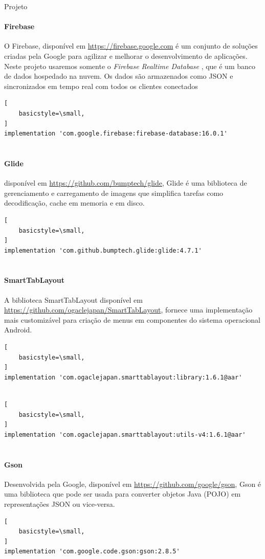 \documentclass[
	12pt,				%
	openright,			%
	twoside,			%
	a4paper,			%
	english,			%
	french,				%
	spanish,			%
	brazil				%
	]{abntex2}
\begin{document}
\begin{chapter}{Projeto}
   \paragraph{Firebase}
O Firebase, disponível em \url{https://firebase.google.com} é um conjunto de soluções criadas pela Google para agilizar e melhorar o desenvolvimento de aplicações. Neste projeto usaremos somente o \textit{Firebase Realtime Database} , que é um banco de dados hospedado na nuvem. Os dados são armazenados como JSON e sincronizados em tempo real com todos os clientes conectados
        \begin{lstlisting}[
    basicstyle=\small,
]
implementation 'com.google.firebase:firebase-database:16.0.1'
  
\end{lstlisting}
   \paragraph{Glide}
   disponível em \url{https://github.com/bumptech/glide}, Glide é uma biblioteca de gerenciamento e carregamento de imagens 
que simplifica tarefas como decodificação, cache em memoria e em disco. 
        \begin{lstlisting}[
    basicstyle=\small,
]
implementation 'com.github.bumptech.glide:glide:4.7.1'
  
\end{lstlisting}
   \paragraph{SmartTabLayout}
   A biblioteca SmartTabLayout disponível em \url{https://github.com/ogaclejapan/SmartTabLayout}, fornece uma implementação mais customizável 
para criação de menus em componentes do sistema operacional Android.
         \begin{lstlisting}[
    basicstyle=\small,
]
implementation 'com.ogaclejapan.smarttablayout:library:1.6.1@aar'
   
\end{lstlisting}
        \begin{lstlisting}[
    basicstyle=\small,
]
implementation 'com.ogaclejapan.smarttablayout:utils-v4:1.6.1@aar'
   
\end{lstlisting}
   \paragraph{Gson}
   Desenvolvida pela Google, disponível em \url{https://github.com/google/gson}, Gson é uma biblioteca que pode ser usada para converter objetos Java (POJO) em representações JSON ou vice-versa.
         \begin{lstlisting}[
    basicstyle=\small,
]
implementation 'com.google.code.gson:gson:2.8.5'
    

\end{lstlisting}
\end{chapter}
\end{document}
